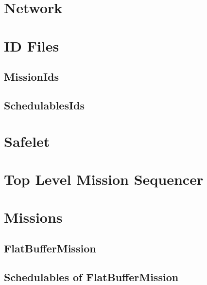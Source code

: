 \documentclass[10pt,a4paper]{article}
\begin{document}
\section{Network}

\newpage

\section{ID Files}
\subsection{MissionIds}


\subsection{SchedulablesIds}

\newpage

\section{Safelet}

\newpage

\section{Top Level Mission Sequencer}

\newpage

\section{Missions}


\subsection{FlatBufferMission}

\newpage

\subsection{Schedulables of FlatBufferMission}


\newpage


\end{document}
